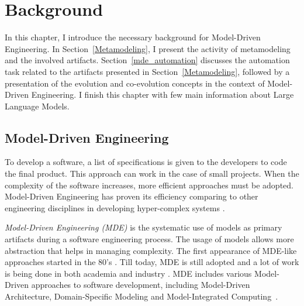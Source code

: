 \clearemptydoublepage
\chapter{Background}

In this chapter, I introduce the necessary background for Model-Driven Engineering. In Section~\ref{Metamodeling}, I present the activity of metamodeling and the involved artifacts. Section~\ref{mde_automation} discusses the automation task related to the artifacts presented in Section~\ref{Metamodeling}, followed by a presentation of the evolution and co-evolution concepts in the context of Model-Driven Engineering. I finish this chapter with few main information about Large Language Models.

\section{Model-Driven Engineering}
\label{mde}
To develop a software, a list of specifications is given to the developers to code the final product. This approach can work in the case of small projects. When the complexity of the software increases, more efficient approaches must be adopted. Model-Driven Engineering has proven its efficiency comparing to other engineering disciplines in developing hyper-complex systems \cite{1231146}.

\textit{Model-Driven Engineering (MDE)} is the systematic use of models as primary artifacts during a software engineering process. The usage of models allows more abstraction that helps in managing complexity. The first appearance of MDE-like approaches started in the 80's \cite{10.1007/s10270-005-0079-0}. Till today, MDE is still adopted  and a lot of work is being done in both academia and industry \cite{Mohagheghi2009,mohagheghi2008proof,jongeling2022Structural,wortmann2020modeling}. MDE includes various Model-Driven approaches to software development, including Model-Driven Architecture, Domain-Specific Modeling and Model-Integrated Computing~\cite{10.1145/1985793.1985882}. 



